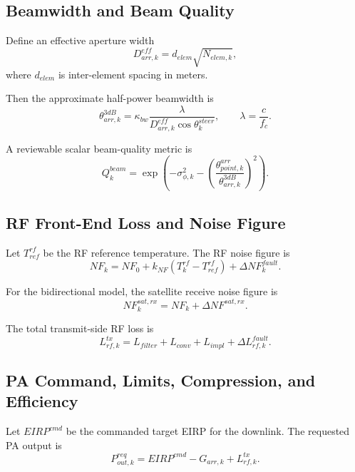 \documentclass[11pt]{article}
\begin{document}
\subsection{Beamwidth and Beam Quality}

Define an effective aperture width
\begin{equation}
  D^{eff}_{arr,k} = d_{elem} \sqrt{N_{elem,k}},
\end{equation}
where $d_{elem}$ is inter-element spacing in meters.

Then the approximate half-power beamwidth is
\begin{equation}
  \theta^{3dB}_{arr,k}
  = \kappa_{bw} \frac{\lambda}{D^{eff}_{arr,k}\cos \theta^{steer}_k},
  \qquad
  \lambda = \frac{c}{f_c}.
\end{equation}

A reviewable scalar beam-quality metric is
\begin{equation}
  Q^{beam}_k
  =
  \exp \left(
    -\sigma_{\phi,k}^2
    - \left(\frac{\theta^{arr}_{point,k}}{\theta^{3dB}_{arr,k}}\right)^2
  \right).
\end{equation}

\subsection{RF Front-End Loss and Noise Figure}

Let $T^{rf}_{ref}$ be the RF reference temperature.
The RF noise figure is
\begin{equation}
  NF_k = NF_0 + k_{NF}(T^{rf}_k - T^{rf}_{ref}) + \Delta NF^{fault}_k.
\end{equation}

For the bidirectional model, the satellite receive noise figure is
\begin{equation}
  NF^{sat,rx}_k = NF_k + \Delta NF^{sat,rx}.
\end{equation}

The total transmit-side RF loss is
\begin{equation}
  L^{tx}_{rf,k} = L_{filter} + L_{conv} + L_{impl} + \Delta L^{fault}_{rf,k}.
\end{equation}

\subsection{PA Command, Limits, Compression, and Efficiency}

Let $EIRP^{cmd}$ be the commanded target EIRP for the downlink. The requested PA output is
\begin{equation}
  P^{req}_{out,k}
  = EIRP^{cmd} - G_{arr,k} + L^{tx}_{rf,k}.
\end{equation}
\end{document}
